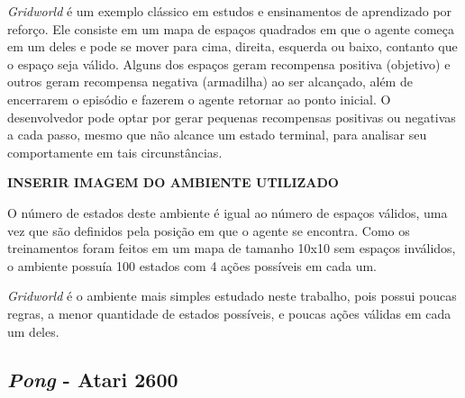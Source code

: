 \textit{Gridworld} é um exemplo clássico em estudos e ensinamentos de aprendizado por reforço.
Ele consiste em um mapa de espaços quadrados em que o agente começa em um deles e pode se mover para cima, direita, esquerda ou baixo, contanto que o espaço seja válido.
Alguns dos espaços geram recompensa positiva (objetivo) e outros geram recompensa negativa (armadilha) ao ser alcançado, além de encerrarem o episódio e fazerem o agente retornar ao ponto inicial.
O desenvolvedor pode optar por gerar pequenas recompensas positivas ou negativas a cada passo, mesmo que não alcance um estado terminal, para analisar seu comportamente em tais circunstâncias.

\textbf{INSERIR IMAGEM DO AMBIENTE UTILIZADO}

O número de estados deste ambiente é igual ao número de espaços válidos, uma vez que são definidos pela posição em que o agente se encontra.
Como os treinamentos foram feitos em um mapa de tamanho 10x10 sem espaços inválidos, o ambiente possuía 100 estados com 4 ações possíveis em cada um.

\textit{Gridworld} é o ambiente mais simples estudado neste trabalho, pois possui poucas regras, a menor quantidade de estados possíveis, e poucas ações válidas em cada um deles.

\subsection{\textit{Pong} - Atari 2600}
\label{sec:pong}

